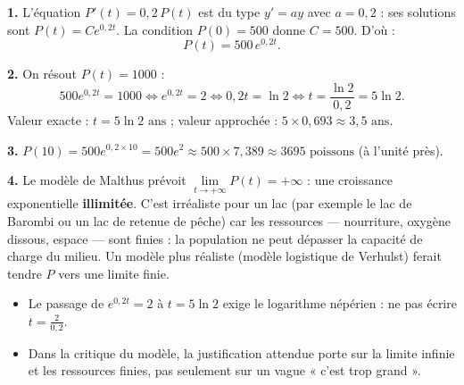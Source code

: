\documentclass[11pt]{article}
\newcommand{\cle}[1]{{\popxbold\color{popdark}#1}}
\begin{document}
\begin{corrige}
\textbf{1.} L'équation $P'(t) = 0{,}2\,P(t)$ est du type $y' = ay$ avec $a = 0{,}2$ : ses solutions sont $P(t) = Ce^{0{,}2t}$. La condition $P(0) = 500$ donne $C = 500$. D'où :
\[ \boxed{P(t) = 500\,e^{0{,}2t}.} \]

\textbf{2.} On résout $P(t) = 1000$ :
\[ 500e^{0{,}2t} = 1000 \iff e^{0{,}2t} = 2 \iff 0{,}2t = \ln 2 \iff t = \frac{\ln 2}{0{,}2} = 5\ln 2. \]
Valeur exacte : $\boxed{t = 5\ln 2 \text{ ans}}$ ; valeur approchée : $5 \times 0{,}693 \approx \boxed{3{,}5 \text{ ans}}$.

\textbf{3.} $P(10) = 500e^{0{,}2 \times 10} = 500e^{2} \approx 500 \times 7{,}389 \approx \boxed{3695 \text{ poissons}}$ (à l'unité près).

\textbf{4.} Le modèle de Malthus prévoit $\lim\limits_{t \to +\infty} P(t) = +\infty$ : une croissance exponentielle \textbf{illimitée}. C'est irréaliste pour un lac (par exemple le lac de Barombi ou un lac de retenue de pêche) car les ressources — nourriture, oxygène dissous, espace — sont finies : la population ne peut dépasser la \cle{capacité de charge} du milieu. Un modèle plus réaliste (modèle logistique de Verhulst) ferait tendre $P$ vers une limite finie.

\begin{attention}
\begin{itemize}
\item Le passage de $e^{0{,}2t} = 2$ à $t = 5\ln 2$ exige le logarithme népérien : ne pas écrire $t = \frac{2}{0{,}2}$.
\item Dans la critique du modèle, la justification attendue porte sur la limite infinie et les ressources finies, pas seulement sur un vague « c'est trop grand ».
\end{itemize}
\end{attention}
\end{corrige}
\end{document}
